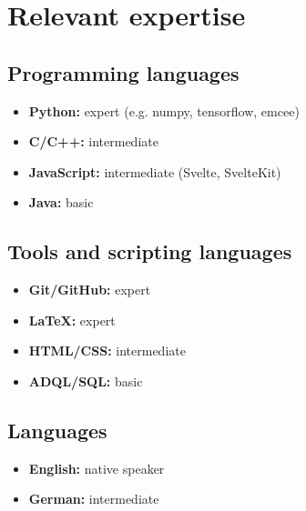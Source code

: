 \documentclass[12pt, letterpaper]{hunt-cv}
\begin{document}


\section*{Relevant expertise}

\subsection*{Programming languages}

\begin{itemize}
    \item \textbf{Python:} expert (e.g. numpy, tensorflow, emcee)
    \item \textbf{C/C++:} intermediate
    \item \textbf{JavaScript:} intermediate (Svelte, SvelteKit)
    \item \textbf{Java:} basic
\end{itemize}

\subsection*{Tools and scripting languages}

\begin{itemize}
    \item \textbf{Git/GitHub:} expert
    \item \textbf{LaTeX:} expert
    \item \textbf{HTML/CSS:} intermediate
    \item \textbf{ADQL/SQL:} basic
\end{itemize}

\subsection*{Languages}

\begin{itemize}
    \item \textbf{English:} native speaker
    \item \textbf{German:} intermediate
\end{itemize}
\end{document}
